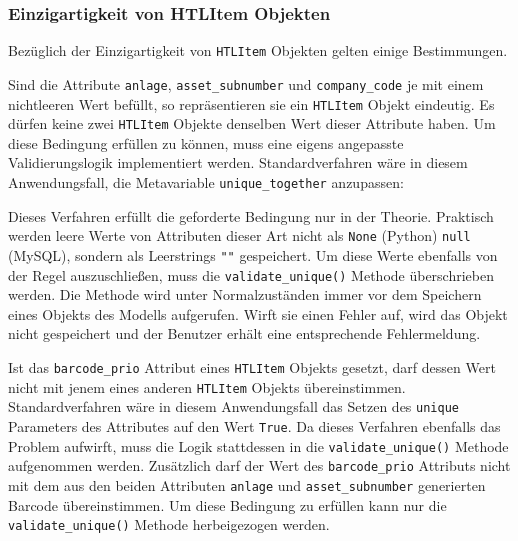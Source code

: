 \hypertarget{einzigartigkeit-von-htlitem-objekten}{%
\subsubsection{Einzigartigkeit von HTLItem
Objekten}\label{einzigartigkeit-von-htlitem-objekten}}

Bezüglich der Einzigartigkeit von \texttt{HTLItem} Objekten gelten
einige Bestimmungen.

Sind die Attribute \texttt{anlage}, \texttt{asset\_subnumber} und
\texttt{company\_code} je mit einem nichtleeren Wert befüllt, so
repräsentieren sie ein \texttt{HTLItem} Objekt eindeutig. Es dürfen
keine zwei \texttt{HTLItem} Objekte denselben Wert dieser Attribute
haben. Um diese Bedingung erfüllen zu können, muss eine eigens
angepasste Validierungslogik implementiert werden. Standardverfahren
wäre in diesem Anwendungsfall, die Metavariable
\texttt{unique\_together} \cite{django-doku-models-options} anzupassen:

\begin{Shaded}
\begin{Highlighting}[]
\OperatorTok{=}\NormalTok{ [[}\NormalTok{,  }\NormalTok{, }\NormalTok{]]}
\end{Highlighting}
\end{Shaded}

Dieses Verfahren erfüllt die geforderte Bedingung nur in der Theorie.
Praktisch werden leere Werte von Attributen dieser Art nicht als
\texttt{None} (Python) \bzw{} \texttt{null} (MySQL), sondern als
Leerstrings \texttt{""} gespeichert. Um diese Werte ebenfalls von der
Regel auszuschließen, muss die \texttt{validate\_unique()} Methode
\cite{django-doku-models-instances} überschrieben werden. Die Methode
wird unter Normalzuständen immer vor dem Speichern eines Objekts des
Modells aufgerufen. Wirft sie einen Fehler auf, wird das Objekt nicht
gespeichert und der Benutzer erhält eine entsprechende Fehlermeldung.

Ist das \texttt{barcode\_prio} Attribut eines \texttt{HTLItem} Objekts
gesetzt, darf dessen Wert nicht mit jenem eines anderen \texttt{HTLItem}
Objekts übereinstimmen. Standardverfahren wäre in diesem Anwendungsfall
das Setzen des \texttt{unique} Parameters des Attributes auf den Wert
\texttt{True}. Da dieses Verfahren ebenfalls das \oa{} Problem aufwirft,
muss die Logik stattdessen in die \texttt{validate\_unique()} Methode
aufgenommen werden. Zusätzlich darf der Wert des \texttt{barcode\_prio}
Attributs nicht mit dem aus den beiden Attributen \texttt{anlage} und
\texttt{asset\_subnumber} generierten Barcode übereinstimmen. Um diese
Bedingung zu erfüllen kann nur die \texttt{validate\_unique()} Methode
herbeigezogen werden.

